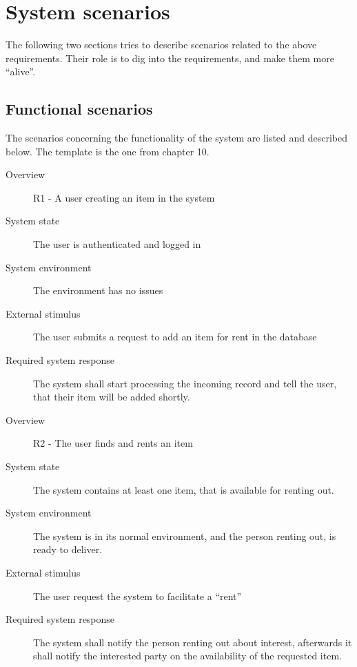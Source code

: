 \documentclass[a4paper,11pt]{report}
\begin{document}
\section{System scenarios}
\label{sec:system-scenarios}
The following two sections tries to describe scenarios related to the above
requirements. Their role is to dig into the requirements, and make them more
``alive''.

\subsection{Functional scenarios}
\label{sec:functional-scenarios}
The scenarios concerning the functionality of the system are listed and
described below. The template is the one from \cite{rozanski2011software}
chapter 10.

\begin{description}
    \item[Overview] R1 - A user creating an item in the system
    \item[System state] The user is authenticated and logged in
    \item[System environment] The environment has no issues
    \item[External stimulus] The user submits a request to add an item for rent
        in the database
    \item[Required system response] The system shall start processing the
        incoming record and tell the user, that their item will be added
        shortly.
\end{description}

\begin{description}
    \item[Overview] R2 - The user finds and rents an item
    \item[System state] The system contains at least one item, that is
        available for renting out.
    \item[System environment] The system is in its normal environment, and the
        person renting out, is ready to deliver.
    \item[External stimulus] The user request the system to facilitate a
        ``rent''
    \item[Required system response] The system shall notify the person renting
        out about interest, afterwards it shall notify the interested party on
        the availability of the requested item.
\end{description}
\end{document}
